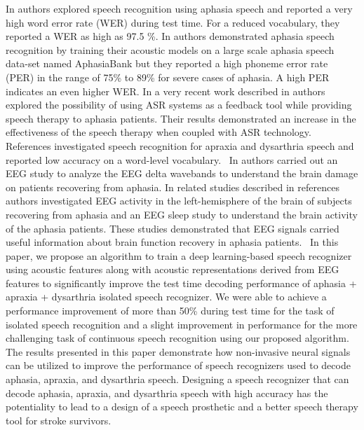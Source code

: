 \documentclass[letterpaper, 10 pt, conference]{ieeeconf}  %
\begin{document}
In \cite{fraser2013automatic} authors explored speech recognition using aphasia speech and reported a very high word error rate (WER) during test time. For a reduced vocabulary, they reported a WER as high as 97.5 \%. In \cite{le2016improving} authors demonstrated aphasia speech recognition by training their acoustic models on a large scale aphasia speech data-set named AphasiaBank but they reported a high phoneme error rate (PER) in the range of 75\% to 89\% for severe cases of aphasia. A high PER indicates an even higher WER. In a very recent work described in \cite{ballard2019feasibility} authors explored the possibility of using ASR systems as a feedback tool while providing speech therapy to aphasia patients. Their results demonstrated an increase in the effectiveness of the speech therapy when coupled with ASR technology. References \cite{jacks2019automated,green2003automatic,ferrier1995dysarthric} investigated speech recognition for apraxia and dysarthria speech and reported low accuracy on a word-level vocabulary. 
In \cite{spironelli2009eeg} authors carried out an EEG study to analyze the EEG delta wavebands to understand the brain damage on patients recovering from aphasia. In related studies described in references \cite{hensel2004left,sarasso2014plastic} authors investigated EEG activity in the left-hemisphere of the brain of subjects recovering from aphasia and an EEG sleep study to understand the brain activity of the aphasia patients. These studies demonstrated that EEG signals carried useful information about brain function recovery in aphasia patients. 
In this paper, we propose an algorithm to train a deep learning-based speech recognizer using acoustic features along with acoustic representations derived from EEG features to significantly improve the test time decoding performance of aphasia + apraxia + dysarthria isolated speech recognizer. We were able to achieve a performance improvement of more than 50\% during test time for the task of isolated speech recognition and a slight improvement in performance for the more challenging task of continuous speech recognition using our proposed algorithm. The results presented in this paper demonstrate how non-invasive neural signals can be utilized to improve the performance of speech recognizers used to decode aphasia, apraxia, and dysarthria speech. Designing a speech recognizer that can decode aphasia, apraxia, and dysarthria speech with high accuracy has the potentiality to lead to a design of a speech prosthetic and a better speech therapy tool for stroke survivors.
\end{document}
